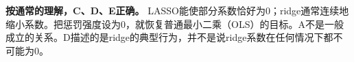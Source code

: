 \textbf{按通常的理解，C、D、E正确。} LASSO能使部分系数恰好为0；ridge通常连续地缩小系数。把惩罚强度设为0，就恢复普通最小二乘（OLS）的目标。A不是一般成立的关系。D描述的是ridge的典型行为，并不是说ridge系数在任何情况下都不可能为0。
